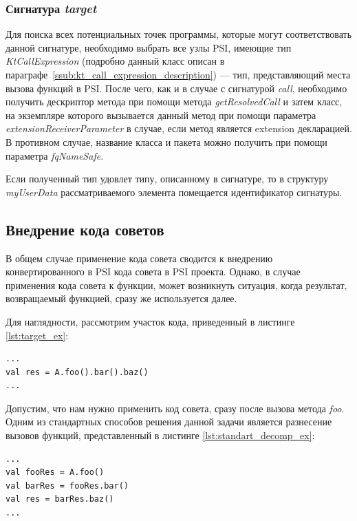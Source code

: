 \subsubsection{Сигнатура \textit{target}}
\label{ssub:target_signature}
Для поиска всех потенциальных точек программы, которые могут соответствовать
данной сигнатуре, необходимо выбрать все узлы PSI, имеющие тип
\textit{KtCallExpression} (подробно данный класс описан в параграфе~\ref{ssub:kt_call_expression_description}) --- тип, представляющий места вызова
функций в PSI.
После чего, как и в случае с сигнатурой \textit{call}, необходимо получить
дескриптор метода при помощи метода \textit{getResolvedCall} и затем класс, на
экземпляре которого вызывается данный метод при помощи параметра
\textit{extensionReceiverParameter} в случае, если метод является extension
декларацией.
В противном случае, название класса и пакета можно получить при помощи параметра
\textit{fqNameSafe}.

Если полученный тип удовлет	типу, описанному в сигнатуре, то в структуру
\textit{myUserData} рассматриваемого элемента помещается идентификатор
сигнатуры.
\subsection{Внедрение кода советов}
\label{sub:advice_applying_description}
В общем случае применение кода совета сводится к внедрению конвертированного в
PSI кода совета в PSI проекта.
Однако, в случае применения кода совета к функции, может возникнуть ситуация,
когда результат, возвращаемый функцией, сразу же используется далее.

Для наглядности, рассмотрим участок кода, приведенный в листинге
\ref{lst:target_ex}:
\begin{lstlisting}[style={java}, label=lst:target_ex,
    caption={Пример целевой точки внедрения}]
...
val res = A.foo().bar().baz()
...
\end{lstlisting}
Допустим, что нам нужно применить код совета, сразу после вызова метода
\textit{foo}.
Одним из стандартных способов решения данной задачи является разнесение вызовов
функций, представленный в листинге \ref{lst:standart_decomp_ex}:
\begin{lstlisting}[style={java}, label=lst:standart_decomp_ex,
    caption={Пример разнесения вызовов методов}]
...
val fooRes = A.foo()
val barRes = fooRes.bar()
val res = barRes.baz()
...
\end{lstlisting}


